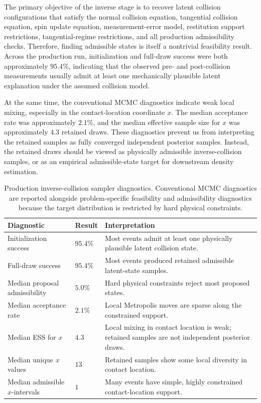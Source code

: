 \documentclass[11pt]{article}
\begin{document}
The primary objective of the inverse stage is to recover latent collision configurations that satisfy the normal collision equation, tangential collision equation, spin update equation, measurement-error model, restitution support restrictions, tangential-regime restrictions, and all production admissibility checks. Therefore, finding admissible states is itself a nontrivial feasibility result. Across the production run, initialization and full-draw success were both approximately \(95.4\%\), indicating that the observed pre- and post-collision measurements usually admit at least one mechanically plausible latent explanation under the assumed collision model.

At the same time, the conventional MCMC diagnostics indicate weak local mixing, especially in the contact-location coordinate \(x\). The median acceptance rate was approximately \(2.1\%\), and the median effective sample size for \(x\) was approximately \(4.3\) retained draws. These diagnostics prevent us from interpreting the retained samples as fully converged independent posterior samples. Instead, the retained draws should be viewed as physically admissible inverse-collision samples, or as an empirical admissible-state target for downstream density estimation.

\begin{table}[H]
\centering
\caption{Production inverse-collision sampler diagnostics. Conventional MCMC diagnostics are reported alongside problem-specific feasibility and admissibility diagnostics because the target distribution is restricted by hard physical constraints.}
\begin{tabular}{p{} p{} p{}}
\hline
\textbf{Diagnostic} & \textbf{Result} & \textbf{Interpretation} \\
\hline
Initialization success & \(95.4\%\) & Most events admit at least one physically plausible latent collision state. \\
Full-draw success & \(95.4\%\) & Most events produced retained admissible latent-state samples. \\
Median proposal admissibility & \(5.0\%\) & Hard physical constraints reject most proposed states. \\
Median acceptance rate & \(2.1\%\) & Local Metropolis moves are sparse along the constrained support. \\
Median ESS for \(x\) & \(4.3\) & Local mixing in contact location is weak; retained samples are not independent posterior draws. \\
Median unique \(x\) values & \(13\) & Retained samples show some local diversity in contact location. \\
Median admissible \(x\)-intervals & \(1\) & Many events have simple, highly constrained contact-location support. \\
\hline
\end{tabular}
\end{table}
\end{document}
